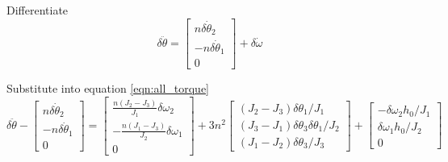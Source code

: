 \documentclass[]{article}
\begin{document}
Differentiate
\begin{equation}
	\delta \ddot{\theta} = \begin{bmatrix}
		n \delta \dot{\theta}_2 \\
		-n \delta \dot{\theta}_1 \\
		0 
	\end{bmatrix} + \delta \dot{\omega}
\end{equation}

Substitute into equation \eqref{eqn:all_torque}
\begin{equation}
	\delta \ddot{\theta} - \begin{bmatrix}
		n \delta \dot{\theta}_2 \\
		-n \delta \dot{\theta}_1 \\
		0 
	\end{bmatrix} = \begin{bmatrix}
	\frac{n(J_2 - J_3)}{J_1} \delta \omega_2 \\
	-\frac{n(J_1 - J_3)}{J_2} \delta \omega_1 \\
	0
\end{bmatrix} +  3 n^2 \begin{bmatrix}
(J_2 - J_3) \delta \theta_1/J_1 \\
(J_3 - J_1) \delta \theta_3 \delta \theta_1/J_2 \\
(J_1 - J_2) \delta \theta_3/J_3
\end{bmatrix} + \begin{bmatrix}
-\delta \omega_2 h_0/J_1 \\
\delta \omega_1 h_0/J_2 \\
0
\end{bmatrix}
\end{equation}
\end{document}
